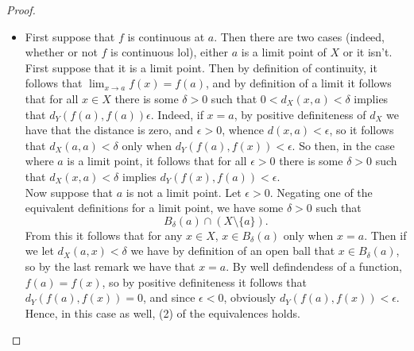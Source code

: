 \documentclass[11pt]{article}
\theoremstyle{definition}
\begin{document}
\begin{proof}

\begin{itemize}
\item
First suppose that $f$ is continuous at $a$. Then there are two cases (indeed, whether or not $f$ is continuous lol), either $a$ is a limit point of $X$ or it isn't. First suppose that it is a limit point. Then by definition of continuity, it follows that $\lim_{x\to a}f(x) = f(a)$, and by definition of a limit it follows that for all $x\in X$ there is some $\delta >0$ such that $ 0 < d_X(x,a) < \delta $ implies that $ d_Y(f(a), f(a) ) \epsilon $. Indeed, if $x = a$, by positive definiteness of $d_X$ we have that the distance is zero, and $\epsilon > 0$, whence $ d(x,a) < \epsilon $, so it follows that $d_X(a,a) < \delta$ only when $d_Y(f(a), f(x) ) < \epsilon$. So then, in the case where $a$ is a limit point, it follows that for all $\epsilon > 0$ there is some $\delta > 0$ such that $d_X(x,a) < \delta$ implies $d_Y(f(x) , f(a) ) < \epsilon$.\\

Now suppose that $ a $ is not a limit point. Let $\epsilon > 0$. Negating one of the equivalent definitions for a limit point, we have some $\delta > 0$ such that $$ B_\delta(a) \cap (X\setminus \{a\}) .$$ 
From this it follows that for any $x\in X$, $x\in B_\delta ( a) $ only when $x = a$.  Then if we let $d_X(a, x) < \delta $  we have by definition of an open ball that $ x\in B_\delta (a) $, so by the last remark we have that $x = a$. By well defindendess of a function, $f(a) = f(x)$, so by positive definiteness it follows that $ d_Y(f(a), f(x) ) = 0 $, and since $\epsilon < 0$, obviously $d_Y(f(a), f(x) ) < \epsilon$. Hence, in this case as well, (2) of the equivalences holds.


\end{itemize}
\end{proof}
\end{document}

